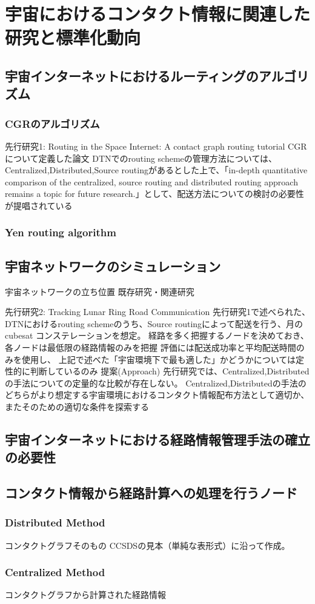 \chapter{宇宙におけるコンタクト情報に関連した研究と標準化動向}

\label{chap:related_works}
\section{宇宙インターネットにおけるルーティングのアルゴリズム}
\subsection{CGRのアルゴリズム}
先行研究1: Routing in the Space Internet: A contact graph routing tutorial
CGRについて定義した論文
DTNでのrouting schemeの管理方法については、Centralized,Distributed,Source routingがあるとした上で、「in-depth quantitative comparison of the centralized, source routing and distributed routing approach remains a topic for future research.」として、配送方法についての検討の必要性が提唱されている
\subsection{Yen routing algorithm}

\section{宇宙ネットワークのシミュレーション}
宇宙ネットワークの立ち位置
既存研究・関連研究

先行研究2: Tracking Lunar Ring Road Communication
先行研究1で述べられた、DTNにおけるrouting schemeのうち、Source routingによって配送を行う、月のcubesat コンステレーションを想定。
経路を多く把握するノードを決めておき、各ノードは最低限の経路情報のみを把握
評価には配送成功率と平均配送時間のみを使用し、
上記で述べた「宇宙環境下で最も適した」かどうかについては定性的に判断しているのみ
提案(Approach)
先行研究では、Centralized,Distributedの手法についての定量的な比較が存在しない。
Centralized,Distributedの手法のどちらがより想定する宇宙環境におけるコンタクト情報配布方法として適切か、またそのための適切な条件を探索する

\section{宇宙インターネットにおける経路情報管理手法の確立の必要性}
\section{コンタクト情報から経路計算への処理を行うノード}
\subsection{Distributed Method}
コンタクトグラフそのもの
CCSDSの見本（単純な表形式）に沿って作成。

\subsection{Centralized Method}
コンタクトグラフから計算された経路情報
